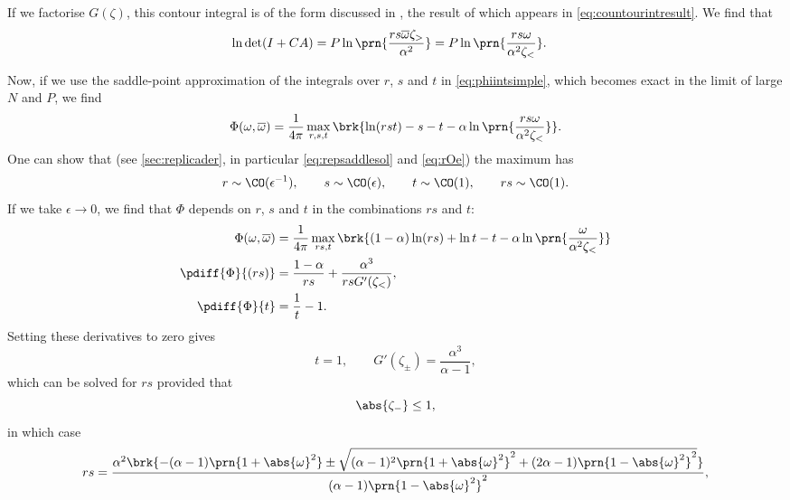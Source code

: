 \documentclass[12pt]{article}
\newcommand{\inv}{^{-1}}
\newcommand{\omb}{\overline{\omega}}
\newcommand{\opo}{\prn{1+\abs{\omega}^2}}
\newcommand{\omo}{\prn{1-\abs{\omega}^2}}
\begin{document}
If we factorise $G(\zeta)$, this contour integral is of the form discussed in , the result of which appears in \eqref{eq:countourintresult}.
We find that
%
\begin{equation}\label{eq:detsimpleresult}
\begin{aligned}
  \ln\det(I+CA) &= P\ln\prn{\frac{rs\omb\zeta_>}{\alpha^2}} = P\ln\prn{\frac{rs\omega}{\alpha^2\zeta_<}}.
\end{aligned}
\end{equation}
%

Now, if we use the saddle-point approximation of the integrals over $r$, $s$ and $t$ in \eqref{eq:phiintsimple}, which becomes exact in the limit of large $N$ and $P$, we find
%
\begin{equation}\label{eq:phisaddlesimple}
  \Phi(\omega,\omb) = \frac{1}{4\pi} \max_{r,s,t} \brk{ \ln(rst) - s - t -\alpha\ln\prn{\frac{rs\omega}{\alpha^2\zeta_<}}}.
\end{equation}
%
One can show that (see \autoref{sec:replicader}, in particular \eqref{eq:repsaddlesol} and \eqref{eq:rOe}) the maximum has
%
\begin{equation}\label{eq:saddleOe}
  r \sim \CO(\epsilon\inv),
  \qquad
  s \sim \CO(\epsilon),
  \qquad
  t \sim \CO(1),
  \qquad
  rs \sim \CO(1).
\end{equation}
%
If we take $\epsilon\to0$, we find that $\Phi$ depends on $r$, $s$ and $t$ in the combinations $rs$ and $t$:
%
\begin{equation}\label{eq:phimaxsimple}
\begin{aligned}
  \Phi(\omega,\omb) &= \frac{1}{4\pi} \max_{rs,t} \brk{ (1-\alpha)\ln(rs)+\ln t - t -\alpha\ln\prn{\frac{\omega}{\alpha^2\zeta_<}}}\\
  \pdiff{\Phi}{(rs)} &= \frac{1-\alpha}{rs} + \frac{\alpha^3}{rs G'(\zeta_<)} ,\\
  \pdiff{\Phi}{t}&= \frac{1}{t} - 1 .
\end{aligned}
\end{equation}
%
Setting these derivatives to zero gives
%
\begin{equation}\label{eq:saddlecond}
  t=1,
  \qquad
  G'(\zeta_\pm)=\frac{\alpha^3}{\alpha-1},
\end{equation}
%
which can be solved for $rs$ provided that
%
\begin{equation}\label{eq:saddlereq}
  \abs{\zeta_-}\leq1,
\end{equation}
%
in which case
%
\begin{equation}\label{eq:saddlesolrs}
\begin{aligned}
  rs &= \frac{\alpha^2 \brk{ -(\alpha-1)\opo \pm \sqrt{ (\alpha-1)^2\opo^2 + (2\alpha-1)\omo^2 } }}{(\alpha-1)\omo^2},\\
\end{aligned}
\end{equation}
\end{document}
